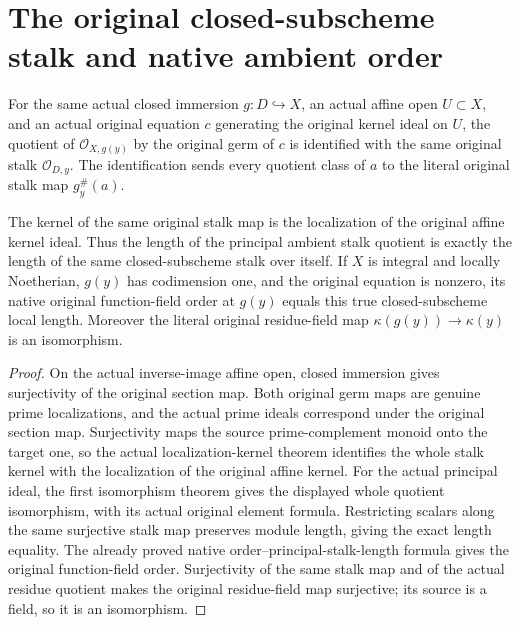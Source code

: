 \section{The original closed-subscheme stalk and native ambient order}

\begin{definition}
\label{def:fc-closed-immersion-principal-stalk-quotient}
\leanok
{}
For the same actual closed immersion $g:D\hookrightarrow X$, an actual affine
open $U\subset X$, and an actual original equation $c$ generating the original
kernel ideal on $U$, the quotient of $\mathcal O_{X,g(y)}$ by the original germ
of $c$ is identified with the same original stalk $\mathcal O_{D,y}$.
The identification sends every quotient class of $a$ to the literal original
stalk map $g_y^\#(a)$.
\end{definition}

\begin{theorem}
\label{thm:fc-closed-immersion-stalk-order-length}
\leanok
{}
The kernel of the same original stalk map is the localization of the original
affine kernel ideal. Thus the length of the principal ambient stalk quotient
is exactly the length of the same closed-subscheme stalk over itself.
If $X$ is integral and locally Noetherian, $g(y)$ has codimension one, and the
original equation is nonzero, its native original function-field order at
$g(y)$ equals this true closed-subscheme local length. Moreover the literal
original residue-field map $\kappa(g(y))\to\kappa(y)$ is an isomorphism.
\end{theorem}
\begin{proof}
On the actual inverse-image affine open, closed immersion gives surjectivity
of the original section map. Both original germ maps are genuine prime
localizations, and the actual prime ideals correspond under the original
section map. Surjectivity maps the source prime-complement monoid onto the
target one, so the actual localization-kernel theorem identifies the whole
stalk kernel with the localization of the original affine kernel. For the
actual principal ideal, the first isomorphism theorem gives the displayed
whole quotient isomorphism, with its actual original element formula.
Restricting scalars along the same surjective stalk map preserves module
length, giving the exact length equality. The already proved native
order--principal-stalk-length formula gives the original function-field
order. Surjectivity of the same stalk map and of the actual residue quotient
makes the original residue-field map surjective; its source is a field, so
it is an isomorphism.
\end{proof}
